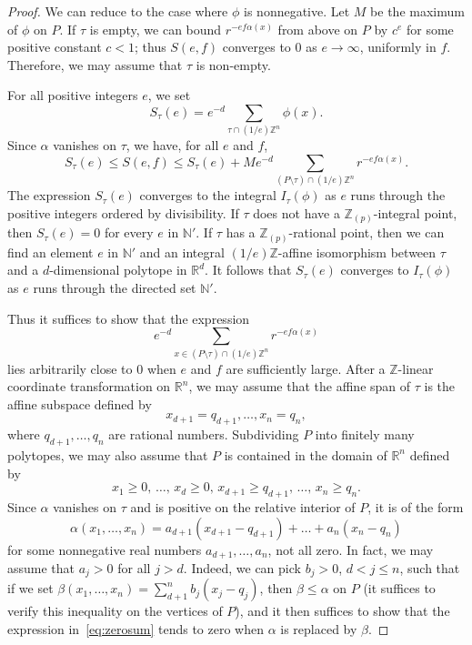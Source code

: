 \documentclass[11pt]{article}
\theoremstyle{definition}
\numberwithin{equation}{subsection}
\newcommand{\N}{\ensuremath{\mathbb{N}}}
\newcommand{\Z}{\ensuremath{\mathbb{Z}}}
\newcommand{\R}{\ensuremath{\mathbb{R}}}
\begin{document}
\begin{proof}
We can reduce to the case where $\phi$ is nonnegative. Let $M$ be the maximum of $\phi$ on $P$.
If $\tau $ is empty, we can bound $r^{-ef\alpha(x)}$ from above on $P$ by $c^e$ for some positive constant $c<1$; thus $S(e,f)$ converges to $0$ as $e\to \infty$, uniformly in $f$. Therefore, we may assume that $\tau$ is non-empty.

For all positive integers $e$, we set
\[
S_{\tau}(e)=e^{-d}\sum_{\tau\cap (1/e)\Z^n}\phi(x).
\]
Since $\alpha$ vanishes on $\tau$, we have, for all $e$ and $f$,
\[
S_{\tau}(e) \leq S(e,f)\leq S_{\tau}(e)+ Me^{-d}\sum_{(P\setminus \tau)\cap (1/e)\Z^n}r^{-ef\alpha(x)}.
\]
The expression $S_{\tau}(e)$ converges to the integral $I_{\tau}(\phi)$ as $e$ runs through the positive integers ordered by divisibility. If $\tau$ does not have a $\Z_{(p)}$-integral point,
then $S_{\tau}(e)=0$ for every $e$ in $\N'$.
If $\tau$ has a $\Z_{(p)}$-rational point, then we can find an element $e$ in $\N'$
and an integral $(1/e)\Z$-affine isomorphism between $\tau$ and a $d$-dimensional polytope in $\R^d$.
It follows that $S_{\tau}(e)$ converges to $I_{\tau}(\phi)$ as $e$ runs through the directed set $\N'$.

Thus it suffices to show that the expression
\begin{equation}\label{eq:zerosum}
e^{-d}\sum_{x\in (P\setminus \tau)\cap (1/e)\Z^n}r^{-ef\alpha(x)}
\end{equation}
lies arbitrarily close to $0$ when $e$ and $f$ are sufficiently large.
After a $\Z$-linear coordinate transformation on $\R^n$, we may assume that the affine span of $\tau$ is the affine subspace defined by
\[
x_{d+1}=q_{d+1},\ldots,x_n=q_n,
\]
where $q_{d+1},\ldots,q_n$ are rational numbers. Subdividing $P$ into finitely many polytopes, we may also assume that $P$ is contained in the domain of $\R^n$ defined by
\[
x_1\geq 0,\,\ldots,\,x_d\geq 0,\,x_{d+1}\geq q_{d+1},\,\ldots,\,x_n\geq q_n.
\]
Since $\alpha$ vanishes on $\tau$ and is positive on the relative interior of $P$, it is of the form
\[
\alpha(x_1,\ldots,x_n)=a_{d+1}(x_{d+1}-q_{d+1})+\ldots+ a_{n}(x_{n}-q_{n})
\]
for some nonnegative real numbers $a_{d+1},\ldots,a_n$, not all zero.
In fact, we may assume that $a_j>0$ for all $j>d$. Indeed, we can pick $b_j>0$, $d<j\le n$, such that if we set $\beta(x_1,\dots,x_n)=\sum_{d+1}^nb_j(x_j-q_j)$, then $\beta\le\alpha$ on $P$ (it suffices to verify this inequality on the vertices of $P$), and it then suffices to show that the expression in~\eqref{eq:zerosum} tends to zero when $\alpha$ is replaced by $\beta$.


\end{proof}
\end{document}
